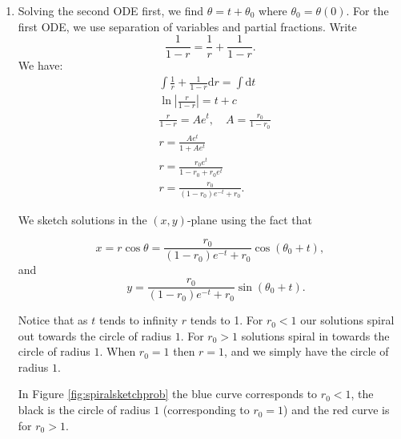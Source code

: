 \documentclass[
  a4paper,
  oneside,
  final]{krantz}
\renewcommand{\d}{\mathrm{d}}
\theoremstyle{definition}
\theoremstyle{definition}
\theoremstyle{definition}
\theoremstyle{definition}
\theoremstyle{remark}
\begin{document}
\begin{enumerate}
\def\labelenumi{\alph{enumi}.}
\item
  Solving the second ODE first, we find \(\theta = t + \theta_0\) where \(\theta_0 = \theta(0)\).
  For the first ODE, we use separation of variables and partial fractions. Write
  \[
       \frac{1}{1-r} = \frac{ 1}{r} + \frac{1}{1-r}.
   \]
  We have:
  \begin{align*}
       &\int \frac{ 1}{r} + \frac{1}{1-r} \d r = \int \d t \\
       & \ln \left|\frac{r}{1-r}\right| = t + c \\
       & \frac{r}{1-r} = Ae^{t}, \quad A = \frac{r_0 }{1-r_0} \\
       & r = \frac{Ae^{t}}{1+ Ae^{t}} \\
       & r = \frac{r_0 e^{t}}{ 1- r_0 + r_0 e^{t}} \\
       & r = \frac{r_0}{(1-r_0)e^{-t} + r_0}.
   \end{align*}

  We sketch solutions in the \((x,y)\)-plane using the fact that

  \[x = r\cos \theta = \frac{r_0}{(1-r_0)e^{-t} + r_0} \cos (\theta_0 + t),\]
  and\\
  \[\quad y =  \frac{r_0}{(1-r_0)e^{-t} + r_0} \sin (\theta_0 + t).\]

  Notice that as \(t\) tends to infinity \(r\) tends to 1. For \(r_0 <1\) our solutions spiral out towards the circle of radius \(1\). For \(r_0 >1\) solutions spiral in towards the circle of radius \(1\). When \(r_0 = 1\) then \(r = 1\), and we simply have the circle of radius \(1\).

  In Figure \ref{fig:spiralsketchprob} the blue curve corresponds to \(r_0 <1\), the black is the circle of radius \(1\) (corresponding to \(r_0 = 1\)) and the red curve is for \(r_0 >1\).


\end{enumerate}
\end{document}
